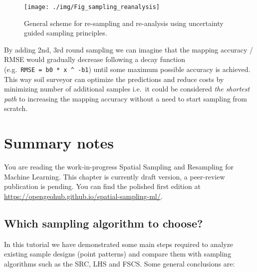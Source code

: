 \documentclass[
  graybox,natbib,nospthms]{svmono}
\begin{document}
\begin{figure}

{\centering \texttt{[image: ./img/Fig\_sampling\_reanalysis]} 

}

\caption{General scheme for re-sampling and re-analysis using uncertainty guided sampling principles.}\label{fig:scheme-resample}
\end{figure}

By adding 2nd, 3rd round sampling we can imagine that the mapping accuracy / RMSE
would gradually decrease following a decay function (e.g.~\texttt{RMSE\ =\ b0\ *\ x\ \^{}\ -b1}) until some
maximum possible accuracy is achieved. This way soil surveyor can optimize the
predictions and reduce costs by minimizing number of additional samples i.e.~it
could be considered \emph{the shortest path} to increasing the mapping accuracy without
a need to start sampling from scratch.

\hypertarget{summary-notes}{%
\chapter{Summary notes}\label{summary-notes}}

You are reading the work-in-progress Spatial Sampling and Resampling for Machine Learning. This chapter is currently draft version, a peer-review publication is pending. You can find the polished first edition at \url{https://opengeohub.github.io/spatial-sampling-ml/}.

\hypertarget{which-sampling-algorithm-to-choose}{%
\section{Which sampling algorithm to choose?}\label{which-sampling-algorithm-to-choose}}

In this tutorial we have demonstrated some main steps required to analyze
existing sample designs (point patterns) and compare them with sampling algorithms
such as the SRC, LHS and FSCS. Some general conclusions are:
\end{document}
